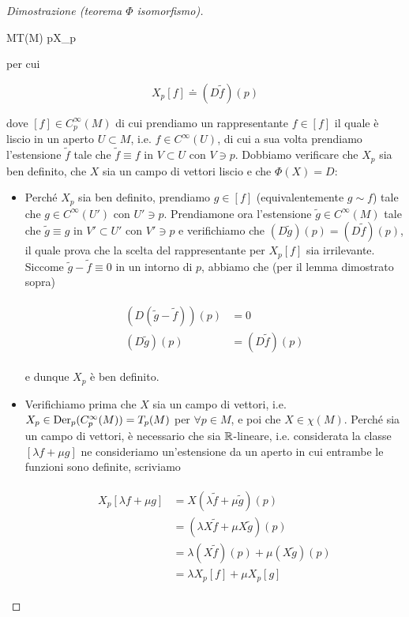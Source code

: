\begin{proof}[Dimostrazione (teorema $ \Phi $ isomorfismo)]
\begin{itemize}
		{M}{T(M)}
		{p}{X_{p}}

	per cui
	
	\begin{equation}
		X_{p} [f] \doteq (D \tilde{f})(p)
	\end{equation}

	dove $ [f] \in C_{p}^{\infty}(M) $ di cui prendiamo un rappresentante $ f \in [f] $ il quale è liscio in un aperto $ U \subset M $, i.e. $ f \in C^{\infty}(U) $, di cui a sua volta prendiamo l'estensione $ \tilde{f} $ tale che $ \tilde{f} \equiv f $ in $ V \subset U $ con $ V \ni p $. Dobbiamo verificare che $ X_{p} $ sia ben definito, che $ X $ sia un campo di vettori liscio e che $ \Phi(X) = D $:
	
	\begin{itemize}
		\item Perché $ X_{p} $ sia ben definito, prendiamo $ g \in [f] $ (equivalentemente $ g \sim f $) tale che $ g \in C^{\infty}(U') $ con $ U' \ni p $. Prendiamone ora l'estensione $ \tilde{g} \in C^{\infty}(M) $ tale che $ \tilde{g} \equiv g $ in $ V' \subset U' $ con $ V' \ni p $ e verifichiamo che $ (D \tilde{g})(p) = (D \tilde{f})(p) $, il quale prova che la scelta del rappresentante per $ X_{p} [f] $ sia irrilevante. Siccome $ \tilde{g} - \tilde{f} \equiv 0 $ in un intorno di $ p $, abbiamo che (per il lemma dimostrato sopra)
		
		\begin{align}
			\begin{split}
				(D (\tilde{g} - \tilde{f}))(p) &= 0 \\
				(D \tilde{g})(p) &= (D \tilde{f})(p)
			\end{split}
		\end{align}
		
		e dunque $ X_{p} $ è ben definito.
		
		\item Verifichiamo prima che $ X $ sia un campo di vettori, i.e. $ X_{p} \in \operatorname{Der}_{p}(C_{p}^{\infty}(M)) = T_{p}(M) $ per $ \forall p \in M $, e poi che $ X \in \chi(M) $. Perché sia un campo di vettori, è necessario che sia $ \mathbb{R} $-lineare, i.e. considerata la classe $ [\lambda f + \mu g] $ ne consideriamo un'estensione da un aperto in cui entrambe le funzioni sono definite, scriviamo
		
		\begin{align}
			\begin{split}
				X_{p} [\lambda f + \mu g] &= X (\lambda \tilde{f} + \mu \tilde{g})(p)\\
				&= (\lambda X \tilde{f} + \mu X \tilde{g})(p)\\
				&= \lambda (X \tilde{f})(p) + \mu (X \tilde{g})(p)\\
				&= \lambda X_{p} [f] + \mu X_{p} [g]
			\end{split}
		\end{align}
	

\end{itemize}
\end{itemize}
\end{proof}
